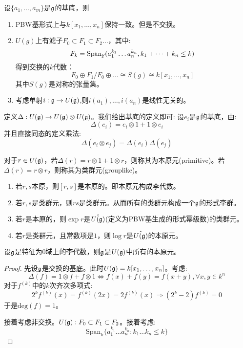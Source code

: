 \begin{theorem}[PBW]
    设$\{a_1,\dots,a_m\}$是$\mathfrak{g}$的基底，则
\end{theorem}
\begin{remark}
    \begin{enumerate}
        \item PBW基形式上与$k[x_1,\dots,x_n]$保持一致。但是不交换。
        \item $U(g)$上有滤子$F_0 \subset F_1 \subset F_2 \dots$，其中:
        $$
        F_k=\mathrm{Span}_{\mathbb{F}}(a_1^{k_1}\dots a_n^{k_n},k_1+\dots+k_n \leq k)
        $$
        得到交换的$k$代数：
        $$
        F_0 \oplus F_1/F_0 \oplus \dots \cong S(g)\cong k[x_1,\dots,x_n] 
        $$
        其中$S(g)$是对称的张量集。
        \item 考虑单射$i:\mathfrak{g} \to U(\mathfrak{g})$,则$i(a_1),\dots,i(a_n)$是线性无关的。
    \end{enumerate}
\end{remark}
\begin{definition}[$U(\g)$的上乘法]
    定义$\Delta:U(\mathfrak{g})\to U(\mathfrak{g})\otimes U(\mathfrak{g})$。我们给出基底的定义即可:
    设$e_i$是$\mathfrak{g}$的基底，由:
    $$
    \Delta(e_i)=e_i \otimes 1+1 \otimes e_i
    $$
    并且直接同态的定义乘法:
    $$
    \Delta(e_i\otimes e_j)=\Delta(e_i)\Delta(e_j)
    $$

\end{definition}
\begin{definition}
    对于$r \in U(\mathfrak{g})$，若$\Delta(r)=r \otimes 1+1 \otimes r$，则称其为本原元(primitive)。若$\Delta(r)=r \otimes r$，则称其为类群元(grouplike)。 
\end{definition}
\begin{proposition}
    \begin{enumerate}
        \item 若$r,s$本原，则$[r,s]$是本原的。即本原元构成李代数。
        \item 若$r,s$是类群元，则$rs$是类群元。从而所有的类群元构成一个$\mathfrak{g}$的形式李群。
        \item 若$r$是本原的，则$\exp r$是$\hat{U(\mathfrak{g})}$(定义为PBW基生成的形式幂级数)的类群元。
        \item 若$r$是类群元，且常数项是$1$，则$\log r$是$\hat{U(\mathfrak{g})}$的本原元。
    \end{enumerate}
\end{proposition}
\begin{theorem}
    设$\mathfrak{g}$是特征为$0$域上的李代数，则$\mathfrak{g}$是$U(\g)$中所有的本原元。
\end{theorem}
\begin{proof}
    先设$\mathfrak{g}$是交换的基底。此时$U(\mathfrak{g})=k[x_1,\dots,x_n]$。考虑:
    $$
    \Delta(f)=1\otimes f+f \otimes 1 \Leftrightarrow f(x)+f(y)=f(x+y),\forall x,y \in k^n
    $$
    对于$f^{(k)}$中的$k$次齐次多项式:
    $$
    2^k f^{(k)}(x)=f^{(k)}(2x)=2f^{(k)}(x) \Rightarrow (2^k-2)f^{(k)}=0
    $$
    于是$\mathrm{deg}(f)=1$。

    接着考虑非交换。$U(\mathfrak{g}):F_0 \subset F_1 \subset F_2$。接着考虑:
    $$
    \mathrm{Span}_k\{a_1^{k_1}\dots a_n^{k_n}:k_1\dots k_n \leq k\}
    $$
\end{proof}
